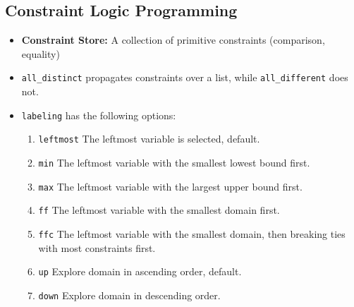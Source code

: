 \documentclass[landscape, letterpaper]{extarticle}
\theoremstyle{definition}
\begin{document}
\begin{multicols}{3}
    \section*{Constraint Logic Programming}
    \begin{itemize}[noitemsep,nolistsep]
        \item \textbf{Constraint Store:} A collection of primitive constraints (comparison, equality)
        \item \verb|all_distinct| propagates constraints over a list, while \verb|all_different| does not.
        \item \verb|labeling| has the following options:
        \begin{enumerate}
            \item \verb|leftmost| The leftmost variable is selected, default.
            \item \verb|min| The leftmost variable with the smallest lowest bound first.
            \item \verb|max| The leftmost variable with the largest upper bound first.
            \item \verb|ff| The leftmost variable with the smallest domain first.
            \item \verb|ffc| The leftmost variable with the smallest domain, then breaking ties with most constraints first.
            \item \verb|up| Explore domain in ascending order, default.
            \item \verb|down| Explore domain in descending order.
        \end{enumerate}
    \end{itemize}

\end{multicols}
\end{document}
